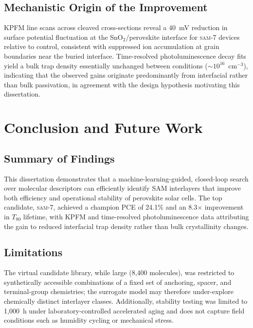 \documentclass[12pt,a4paper,oneside]{report}
\begin{document}
\section{Mechanistic Origin of the Improvement}

KPFM line scans across cleaved cross-sections reveal a 40~mV reduction in
surface potential fluctuation at the SnO$_2$/perovskite interface for
\textsc{sam-7} devices relative to control, consistent with suppressed
ion accumulation at grain boundaries near the buried interface.
Time-resolved photoluminescence decay fits yield a bulk trap density
essentially unchanged between conditions ($\sim 10^{16}$~cm$^{-3}$),
indicating that the observed gains originate predominantly from
interfacial rather than bulk passivation, in agreement with the design
hypothesis motivating this dissertation.

\chapter{Conclusion and Future Work}

\section{Summary of Findings}

This dissertation demonstrates that a machine-learning-guided,
closed-loop search over molecular descriptors can efficiently identify
SAM interlayers that improve both efficiency and operational stability of
perovskite solar cells. The top candidate, \textsc{sam-7}, achieved a
champion PCE of 24.1\% and an 8.3$\times$ improvement in $T_{80}$
lifetime, with KPFM and time-resolved photoluminescence data attributing
the gain to reduced interfacial trap density rather than bulk
crystallinity changes.

\section{Limitations}

The virtual candidate library, while large (8{,}400 molecules), was
restricted to synthetically accessible combinations of a fixed set of
anchoring, spacer, and terminal-group chemistries; the surrogate model
may therefore under-explore chemically distinct interlayer classes.
Additionally, stability testing was limited to 1{,}000~h under
laboratory-controlled accelerated aging and does not capture field
conditions such as humidity cycling or mechanical stress.
\end{document}
